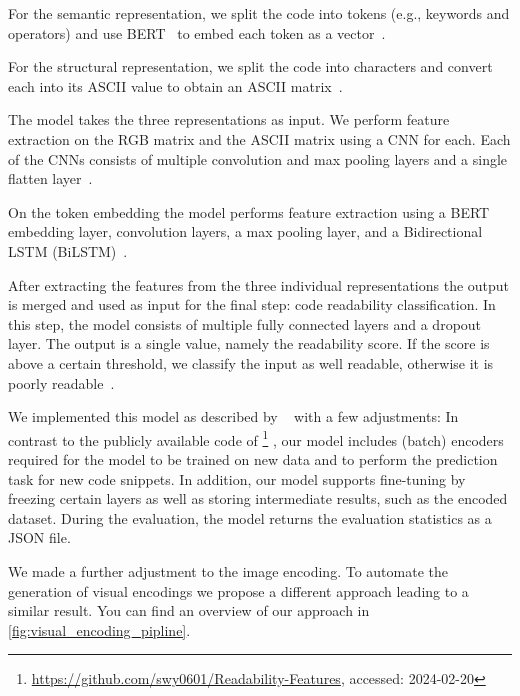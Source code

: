 \documentclass[%
class=scrreprt,
chapterprefix=false,%
open=right,%
twoside=true,%
paper=a4,%
logofile={Logo\_zentral\_farbig\_EN.png},%
thesistype=master,%
UKenglish,%
]{se2thesis}
\newcounter{urlfootnote}
\newcommand{\onecurl}[2]{%
	\stepcounter{urlfootnote}%
	\expandafter\def\csname urlfootnote:#1\endcsname{\theurlfootnote}%
	\footnote{\label{url:#1}\url{#1}, accessed: #2}%
}
\newcommand{\curl}[2]{%
		\onecurl{#1}{#2}%
}
\theoremstyle{definition}
\begin{document}
	For the semantic representation, we split the code into tokens (e.g., keywords and operators) and use BERT~\cite{devlin2018bert} to embed each token as a vector~\cite{mi2022towards}.
	
	For the structural representation, we split the code into characters and convert each into its ASCII value to obtain an ASCII matrix~\cite{mi2022towards}.
	
	The model takes the three representations as input. We perform feature extraction on the RGB matrix and the ASCII matrix using a CNN for each. Each of the CNNs consists of multiple convolution and max pooling layers and a single flatten layer~\cite{mi2022towards}. 
	
	On the token embedding the model performs feature extraction using a BERT embedding layer, convolution layers, a max pooling layer, and a Bidirectional LSTM (BiLSTM)~\cite{mi2022towards}.
	
	After extracting the features from the three individual representations the output is merged and used as input for the final step: code readability classification. In this step, the model consists of multiple fully connected layers and a dropout layer. The output is a single value, namely the readability score. If the score is above a certain threshold, we classify the input as well readable, otherwise it is poorly readable~\cite{mi2022towards}.
	
	We implemented this model as described by \citeauthor{mi2022towards}~\cite{mi2022towards} with a few adjustments:
	In contrast to the publicly available code of \citeauthor{mi2022towards}\curl{https://github.com/swy0601/Readability-Features}{2024-02-20}, our model includes (batch) encoders required for the model to be trained on new data and to perform the prediction task for new code snippets. In addition, our model supports fine-tuning by freezing certain layers as well as storing intermediate results, such as the encoded dataset. During the evaluation, the model returns the evaluation statistics as a JSON file.
	
	We made a further adjustment to the image encoding. To automate the generation of visual encodings we propose a different approach leading to a similar result. You can find an overview of our approach in \autoref{fig:visual_encoding_pipline}.
	
\end{document}

